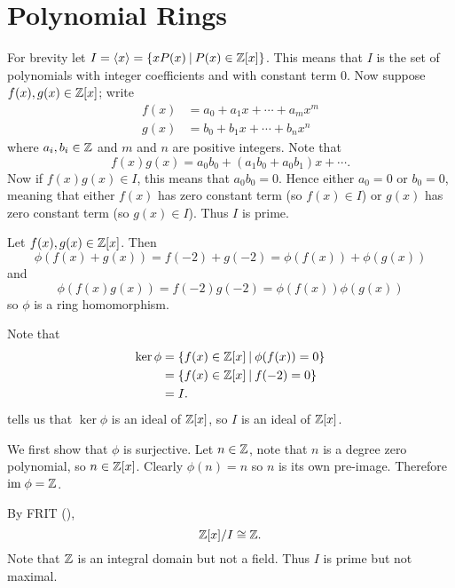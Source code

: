 \section{Polynomial Rings}
\begin{questions}
    \item For brevity let $I = \princ{x} = \{xP(x) \vert P(x) \in \Z[x]\}$. This means that $I$ is the set of polynomials with integer coefficients and with constant term 0. Now suppose $f(x), g(x) \in \mathbb{Z}[x]$; write
    \begin{align*}
        f(x) &= a_0 + a_1x + \cdots + a_mx^m\\
        g(x) &= b_0 + b_1x + \cdots + b_nx^n
    \end{align*}
    where $a_i, b_i \in \mathbb{Z}$ and $m$ and $n$ are positive integers. Note that
    \[
        f(x)g(x) = a_0b_0 + (a_1b_0+a_0b_1)x + \cdots.
    \]
    Now if $f(x)g(x) \in I$, this means that $a_0b_0 = 0$. Hence either $a_0 = 0$ or $b_0 = 0$, meaning that either $f(x)$ has zero constant term (so $f(x) \in I$) or $g(x)$ has zero constant term (so $g(x) \in I$). Thus $I$ is prime.

    \item \begin{partquestions}{\roman*}
        \item Let $f(x), g(x) \in \mathbb{Z}[x]$. Then
        \[
            \phi(f(x) + g(x)) = f(-2) + g(-2) = \phi(f(x)) + \phi(g(x))
        \]
        and
        \[
            \phi(f(x)g(x)) = f(-2)g(-2) = \phi(f(x))\phi(g(x))
        \]
        so $\phi$ is a ring homomorphism.

        \item Note that
        \begin{align*}
            \ker\phi &= \{f(x) \in \Z[x] \vert \phi(f(x)) = 0\}\\
            &= \{f(x) \in \Z[x] \vert f(-2) = 0\}\\
            &= I.
        \end{align*}
         tells us that $\ker\phi$ is an ideal of $\mathbb{Z}[x]$, so $I$ is an ideal of $\mathbb{Z}[x]$.

        \item We first show that $\phi$ is surjective. Let $n \in \mathbb{Z}$, note that $n$ is a degree zero polynomial, so $n \in \mathbb{Z}[x]$. Clearly $\phi(n) = n$ so $n$ is its own pre-image. Therefore $\mathrm{im}\;\phi = \mathbb{Z}$.
        
        By FRIT (),
        \[
            \mathbb{Z}[x]/I \cong \mathbb{Z}.
        \]
        Note that $\mathbb{Z}$ is an integral domain but not a field. Thus $I$ is prime but not maximal.
    \end{partquestions}
\end{questions}
